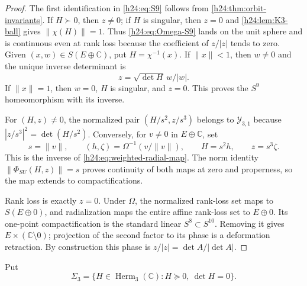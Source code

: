 \begin{proof}
The first identification in \eqref{h24:eq:S9} follows from
\cref{h24:thm:orbit-invariants}.  If $H\succ0$, then $z\ne0$; if $H$ is
singular, then $z=0$ and \cref{h24:lem:K3-ball} gives
$\|\chi(H)\|=1$.  Thus \eqref{h24:eq:Omega-S9} lands on the unit sphere and is
continuous even at rank loss because the coefficient of $z/|z|$ tends to
zero.  Given $(x,w)\in S(E\oplus\mathbb C)$, put $H=\chi^{-1}(x)$.  If
$\|x\|<1$, then $w\ne0$ and the unique inverse determinant is
\begin{equation}
 z=\sqrt{\det H}\,w/|w|.
 \label{h24:eq:Omega-inverse}
\end{equation}
If $\|x\|=1$, then $w=0$, $H$ is singular, and $z=0$.  This proves the
$S^9$ homeomorphism with its inverse.

For $(H,z)\ne0$, the normalized pair
$(H/s^2,z/s^3)$ belongs to $\mathcal Y_{3,1}$ because
$|z/s^3|^2=\det(H/s^2)$.  Conversely, for $v\ne0$ in $E\oplus\mathbb C$, set
\[
 s=\|v\|,\qquad (h,\zeta)=\Omega^{-1}(v/\|v\|),\qquad
 H=s^2h,\qquad z=s^3\zeta.
\]
This is the inverse of \eqref{h24:eq:weighted-radial-map}.  The norm identity
$\|\Phi_{SU}(H,z)\|=s$ proves continuity of both maps at zero and properness,
so the map extends to compactifications.

Rank loss is exactly $z=0$.  Under $\Omega$, the normalized rank-loss set
maps to $S(E\oplus0)$, and radialization maps the entire affine rank-loss
set to $E\oplus0$.  Its one-point compactification is the standard linear
$S^8\subset S^{10}$.  Removing it gives
$E\times(\mathbb C\setminus0)$; projection of the second factor to its phase is a
deformation retraction.  By construction this phase is
$z/|z|=\det A/|\det A|$.
\end{proof}

Put
\[
 \Sigma_3=\{H\in\operatorname{Herm}_3(\mathbb C):H\succeq0,\ \det H=0\}.
\]



